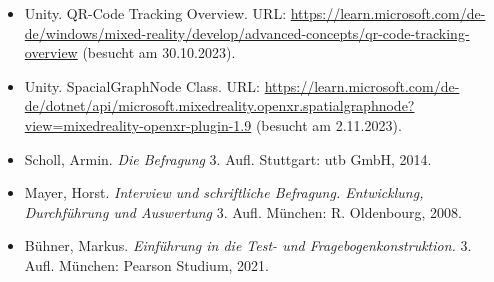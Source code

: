 \begin{itemize}
    \item Unity. QR-Code Tracking Overview. URL: \url{https://learn.microsoft.com/de-de/windows/mixed-reality/develop/advanced-concepts/qr-code-tracking-overview} (besucht am 30.10.2023).
    \item Unity. SpacialGraphNode Class. URL: \url{https://learn.microsoft.com/de-de/dotnet/api/microsoft.mixedreality.openxr.spatialgraphnode?view=mixedreality-openxr-plugin-1.9} (besucht am 2.11.2023).
    \item Scholl, Armin. \textit{Die Befragung} 3. Aufl. Stuttgart: utb GmbH, 2014.
    \item Mayer, Horst. \textit{Interview und schriftliche Befragung. Entwicklung, Durchführung und Auswertung} 3. Aufl. München: R. Oldenbourg, 2008.
    \item Bühner, Markus. \textit{Einführung in die Test- und Fragebogenkonstruktion.} 3. Aufl. München: Pearson Studium, 2021.
\end{itemize}


